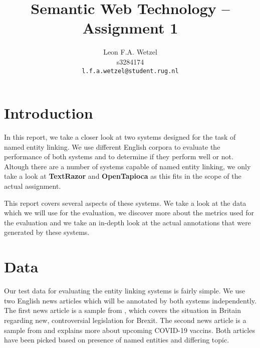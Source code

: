 \documentclass[a4paper, 11pt]{article}
\title{Semantic Web Technology -- Assignment 1}
\author{Leon F.A. Wetzel\\s3284174\\ \texttt{l.f.a.wetzel@student.rug.nl}}
\begin{document}
\maketitle

\section{Introduction}

In this report, we take a closer look at two systems designed for the task of named entity linking. We use different English corpora to evaluate the performance of both systems and to determine if they perform well or not. Altough there are a number of systems capable of named entity linking, we only take a look at \textbf{TextRazor} and \textbf{OpenTapioca} as this fits in the scope of the actual assignment.

This report covers several aspects of these systems. We take a look at the data which we will use for the evaluation, we discover more about the metrics used for the evaluation and we take an in-depth look at the actual annotations that were generated by these systems.

\section{Data}

Our test data for evaluating the entity linking systems is fairly simple. We use two English news articles which will be annotated by both systems independently. The first news article is a sample from \citet{mcgee_2020}, which covers the situation in Britain regarding new, controversial legislation for Brexit. The second news article is a sample from \citet{mckeever_2020} and explains more about upcoming COVID-19 vaccins. Both articles have been picked based on presence of named entities and differing topic.



\end{document}
